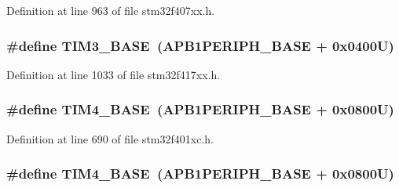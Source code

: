 Definition at line 963 of file stm32f407xx.\+h.

\subsubsection[{\texorpdfstring{T\+I\+M3\+\_\+\+B\+A\+SE}{TIM3_BASE}}]{\setlength{\rightskip}{0pt plus 5cm}\#define T\+I\+M3\+\_\+\+B\+A\+SE~({\bf A\+P\+B1\+P\+E\+R\+I\+P\+H\+\_\+\+B\+A\+SE} + 0x0400\+U)}\hypertarget{group___peripheral__registers__structures_gaf0c34a518f87e1e505cd2332e989564a}{}\label{group___peripheral__registers__structures_gaf0c34a518f87e1e505cd2332e989564a}


Definition at line 1033 of file stm32f417xx.\+h.

\subsubsection[{\texorpdfstring{T\+I\+M4\+\_\+\+B\+A\+SE}{TIM4_BASE}}]{\setlength{\rightskip}{0pt plus 5cm}\#define T\+I\+M4\+\_\+\+B\+A\+SE~({\bf A\+P\+B1\+P\+E\+R\+I\+P\+H\+\_\+\+B\+A\+SE} + 0x0800\+U)}\hypertarget{group___peripheral__registers__structures_ga56e2d44b0002f316527b8913866a370d}{}\label{group___peripheral__registers__structures_ga56e2d44b0002f316527b8913866a370d}


Definition at line 690 of file stm32f401xc.\+h.

\subsubsection[{\texorpdfstring{T\+I\+M4\+\_\+\+B\+A\+SE}{TIM4_BASE}}]{\setlength{\rightskip}{0pt plus 5cm}\#define T\+I\+M4\+\_\+\+B\+A\+SE~({\bf A\+P\+B1\+P\+E\+R\+I\+P\+H\+\_\+\+B\+A\+SE} + 0x0800\+U)}\hypertarget{group___peripheral__registers__structures_ga56e2d44b0002f316527b8913866a370d}{}\label{group___peripheral__registers__structures_ga56e2d44b0002f316527b8913866a370d}


